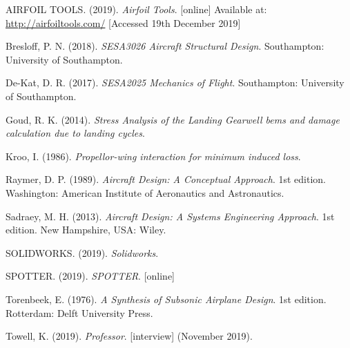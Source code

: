 \documentclass[../main.tex]{subfiles}
\begin{document}
\begin{thebibliography}{999}


  AIRFOIL TOOLS.
  (2019).
  \emph{Airfoil Tools}.
  [online]
  Available at:
  \url{http://airfoiltools.com/}
  [Accessed 19th December 2019]

  Bresloff, P. N.
  (2018).
  \emph{SESA3026 Aircraft Structural Design}.
  Southampton: University of Southampton.

  De-Kat, D. R.
  (2017).
  \emph{SESA2025 Mechanics of Flight}.
  Southampton: University of Southampton.

  Goud, R. K.
  (2014).
  \emph{Stress Analysis of the Landing Gearwell bems and damage calculation due to landing cycles}.

  Kroo, I.
  (1986).
  \emph{Propellor-wing interaction for minimum induced loss}.

  Raymer, D. P.
  (1989).
  \emph{Aircraft Design: A Conceptual Approach}.
  1st edition.
  Washington: American Institute of Aeronautics and Astronautics.

  Sadraey, M. H.
  (2013).
  \emph{Aircraft Design: A Systems Engineering Approach}.
  1st edition.
  New Hampshire, USA: Wiley.

  SOLIDWORKS.
  (2019).
  \emph{Solidworks}.

  SPOTTER.
  (2019).
  \emph{SPOTTER}.
  [online]

  Torenbeek, E.
  (1976).
  \emph{A Synthesis of Subsonic Airplane Design}.
  1st edition.
  Rotterdam: Delft University Press.

  Towell, K.
  (2019).
  \emph{Professor}.
  [interview]
  (November 2019).

\end{thebibliography}
\end{document}
